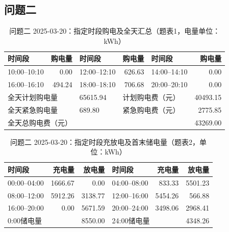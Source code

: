 \clearpage
\subsection{问题二}
\begin{table}[H]
\centering\footnotesize
\setlength{\tabcolsep}{4pt}
\caption{问题二 2025-03-20：指定时段购电及全天汇总（题表1，电量单位：kWh）}
\label{tab:required-q2-2025-03-20-grid}
\begin{tabular}{@{}lrlrlr@{}}
\toprule
时间段 & 购电量 & 时间段 & 购电量 & 时间段 & 购电量 \\
\midrule
10:00--10:10 & 0.00 & 12:00--12:10 & 626.63 & 14:00--14:10 & 0.00 \\
16:00--16:10 & 494.24 & 18:00--18:10 & 706.68 & 20:00--20:10 & 0.00 \\
\multicolumn{2}{l}{全天计划购电量} & 65615.94 & \multicolumn{2}{l}{计划购电费（元）} & 40493.15 \\
\multicolumn{2}{l}{全天紧急购电量} & 689.80 & \multicolumn{2}{l}{紧急购电费（元）} & 2775.85 \\
\multicolumn{5}{l}{全天总购电费（元）} & 43269.00 \\
\bottomrule
\end{tabular}
\end{table}

\begin{table}[H]
\centering\footnotesize
\setlength{\tabcolsep}{4pt}
\caption{问题二 2025-03-20：指定时段充放电及首末储电量（题表2，单位：kWh）}
\label{tab:required-q2-2025-03-20-storage}
\begin{tabular}{@{}lrrlrr@{}}
\toprule
时间段 & 充电量 & 放电量 & 时间段 & 充电量 & 放电量 \\
\midrule
00:00--04:00 & 1666.67 & 0.00 & 04:00--08:00 & 833.33 & 5501.23 \\
08:00--12:00 & 5912.26 & 3138.77 & 12:00--16:00 & 5454.26 & 566.88 \\
16:00--20:00 & 0.00 & 5671.59 & 20:00--24:00 & 3498.06 & 2968.41 \\
\multicolumn{2}{l}{0:00储电量} & 8550.00 & \multicolumn{2}{l}{24:00储电量} & 4348.26 \\
\bottomrule
\end{tabular}
\end{table}

